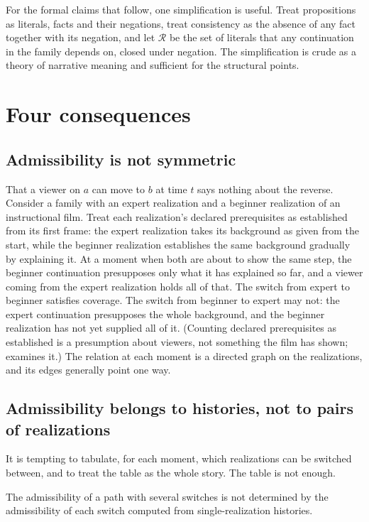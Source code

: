 For the formal claims that follow, one simplification is useful. Treat propositions as literals, facts and their negations, treat consistency as the absence of any fact together with its negation, and let $\mathcal R$ be the set of literals that any continuation in the family depends on, closed under negation. The simplification is crude as a theory of narrative meaning and sufficient for the structural points.

\section{Four consequences}

\subsection*{Admissibility is not symmetric}

That a viewer on $a$ can move to $b$ at time $t$ says nothing about the reverse. Consider a family with an expert realization and a beginner realization of an instructional film. Treat each realization's declared prerequisites as established from its first frame: the expert realization takes its background as given from the start, while the beginner realization establishes the same background gradually by explaining it. At a moment when both are about to show the same step, the beginner continuation presupposes only what it has explained so far, and a viewer coming from the expert realization holds all of that. The switch from expert to beginner satisfies coverage. The switch from beginner to expert may not: the expert continuation presupposes the whole background, and the beginner realization has not yet supplied all of it. (Counting declared prerequisites as established is a presumption about viewers, not something the film has shown;  examines it.) The relation at each moment is a directed graph on the realizations, and its edges generally point one way.

\subsection*{Admissibility belongs to histories, not to pairs of realizations}

It is tempting to tabulate, for each moment, which realizations can be switched between, and to treat the table as the whole story. The table is not enough.

\begin{proposition}
The admissibility of a path with several switches is not determined by the admissibility of each switch computed from single-realization histories.
\end{proposition}


